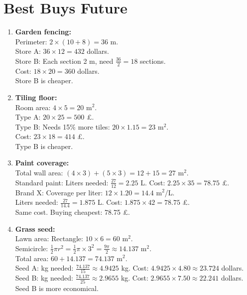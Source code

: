 \documentclass[12pt]{article}
\begin{document}
\section*{Best Buys Future}

\begin{enumerate}[resume]
    \item \textbf{Garden fencing:} \\
    Perimeter: \( 2 \times (10 + 8) = 36\) m. \\
    Store A: \( 36 \times 12 = 432\) dollars. \\
    Store B: Each section 2 m, need \( \frac{36}{2} = 18\) sections. \\
    Cost: \( 18 \times 20 = 360\) dollars. \\
    Store B is cheaper.

    \item \textbf{Tiling floor:} \\
    Room area: \( 4 \times 5 = 20\) m\(^2\). \\
    Type A: \( 20 \times 25 = 500\) £. \\
    Type B: Needs 15\% more tiles: \( 20 \times 1.15 = 23\) m\(^2\). \\
    Cost: \( 23 \times 18 = 414\) £. \\
    Type B is cheaper.

    \item \textbf{Paint coverage:} \\
    Total wall area: \( (4 \times 3) + (5 \times 3) = 12 + 15 = 27\) m\(^2\). \\
    Standard paint: Liters needed: \( \frac{27}{12} = 2.25\) L. Cost: \( 2.25 \times 35 = 78.75\) £. \\
    Brand X: Coverage per liter: \( 12 \times 1.20 = 14.4\) m\(^2\)/L. \\
    Liters needed: \( \frac{27}{14.4} = 1.875\) L. Cost: \( 1.875 \times 42 = 78.75\) £. \\
    Same cost. Buying cheapest: 78.75 £.

    \item \textbf{Grass seed:} \\
    Lawn area: Rectangle: \( 10 \times 6 = 60\) m\(^2\). \\
    Semicircle: \( \frac{1}{2} \pi r^2 = \frac{1}{2} \pi \times 3^2 = \frac{9\pi}{2} \approx 14.137\) m\(^2\). \\
    Total area: \( 60 + 14.137 = 74.137\) m\(^2\). \\
    Seed A: kg needed: \( \frac{74.137}{15} \approx 4.9425\) kg. Cost: \( 4.9425 \times 4.80 \approx 23.724\) dollars. \\
    Seed B: kg needed: \( \frac{74.137}{25} \approx 2.9655\) kg. Cost: \( 2.9655 \times 7.50 \approx 22.241\) dollars. \\
    Seed B is more economical.


\end{enumerate}
\end{document}
